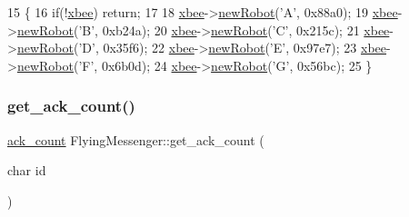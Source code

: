 \begin{DoxyCode}
15                                  \{
16     \textcolor{keywordflow}{if}(!\hyperlink{class_flying_messenger_a419820a45ea2bc496c10bf36b7b49033}{xbee}) \textcolor{keywordflow}{return};
17 
18     \hyperlink{class_flying_messenger_a419820a45ea2bc496c10bf36b7b49033}{xbee}->\hyperlink{class_serial_com_a49c37690ef5f8c76a4c49f568dc1bb7f}{newRobot}(\textcolor{charliteral}{'A'}, 0x88a0);
19     \hyperlink{class_flying_messenger_a419820a45ea2bc496c10bf36b7b49033}{xbee}->\hyperlink{class_serial_com_a49c37690ef5f8c76a4c49f568dc1bb7f}{newRobot}(\textcolor{charliteral}{'B'}, 0xb24a);
20     \hyperlink{class_flying_messenger_a419820a45ea2bc496c10bf36b7b49033}{xbee}->\hyperlink{class_serial_com_a49c37690ef5f8c76a4c49f568dc1bb7f}{newRobot}(\textcolor{charliteral}{'C'}, 0x215c);
21     \hyperlink{class_flying_messenger_a419820a45ea2bc496c10bf36b7b49033}{xbee}->\hyperlink{class_serial_com_a49c37690ef5f8c76a4c49f568dc1bb7f}{newRobot}(\textcolor{charliteral}{'D'}, 0x35f6);
22     \hyperlink{class_flying_messenger_a419820a45ea2bc496c10bf36b7b49033}{xbee}->\hyperlink{class_serial_com_a49c37690ef5f8c76a4c49f568dc1bb7f}{newRobot}(\textcolor{charliteral}{'E'}, 0x97e7);
23     \hyperlink{class_flying_messenger_a419820a45ea2bc496c10bf36b7b49033}{xbee}->\hyperlink{class_serial_com_a49c37690ef5f8c76a4c49f568dc1bb7f}{newRobot}(\textcolor{charliteral}{'F'}, 0x6b0d);
24     \hyperlink{class_flying_messenger_a419820a45ea2bc496c10bf36b7b49033}{xbee}->\hyperlink{class_serial_com_a49c37690ef5f8c76a4c49f568dc1bb7f}{newRobot}(\textcolor{charliteral}{'G'}, 0x56bc);
25 \}
\end{DoxyCode}
\mbox{\label{class_flying_messenger_a89de5f227190cd364bb230ae530e8e4d}} 
\subsubsection{\texorpdfstring{get\+\_\+ack\+\_\+count()}{get\_ack\_count()}}
{\footnotesize\ttfamily \hyperlink{structack__count}{ack\+\_\+count} Flying\+Messenger\+::get\+\_\+ack\+\_\+count (\begin{DoxyParamCaption}\item[{char}]{id }\end{DoxyParamCaption})}



